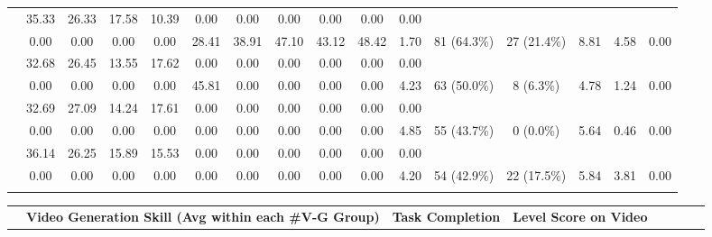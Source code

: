 \documentclass[letterpaper]{article} %
\begin{document}
\begin{table*}[t!]
\begin{tabular}{p{2cm} cccccccccc cc ccc}
\addlinespace[4pt]

\multirow{2}{*}{ Sa2VA-26B} & 35.33 & 26.33 & 17.58 & 10.39 & 0.00 & 0.00 & 0.00 & 0.00 & 0.00 &0.00 &  &  &  &  &  \\
& 0.00 & 0.00 & 0.00 & 0.00 & 28.41 & 38.91 & 47.10 & 43.12 & 48.42 & 1.70 & \multirow{-2}{*}{81 (64.3\%)} & \multirow{-2}{*}{27 (21.4\%)} & \multirow{-2}{*}{8.81} & \multirow{-2}{*}{4.58} & \multirow{-2}{*}{0.00} \\

\addlinespace[4pt]

\rowcolor{bg-tb-light-video} & 32.68 & 26.45 & 13.55 & 17.62 & 0.00 & 0.00 & 0.00 & 0.00 & 0.00 &0.00 &  &  &  &  &  \\
\rowcolor{bg-tb-light-video} \multirow{-2}{*}{ CoLVA-4B}  & 0.00 & 0.00 & 0.00 & 0.00 & 45.81 & 0.00 & 0.00 & 0.00 & 0.00 & 4.23 & \multirow{-2}{*}{63 (50.0\%)} & \multirow{-2}{*}{8 (6.3\%)} & \multirow{-2}{*}{4.78} & \multirow{-2}{*}{1.24} & \multirow{-2}{*}{0.00} \\

\addlinespace[4pt]

\multirow{2}{*}{ InternVL-2-8B} & 32.69 & 27.09 & 14.24 & 17.61 & 0.00 & 0.00 & 0.00 & 0.00 & 0.00 & 0.00 & &  &  &  &  \\
& 0.00 & 0.00 & 0.00 & 0.00 & 0.00 & 0.00 & 0.00 & 0.00 & 0.00 & 4.85 & \multirow{-2}{*}{55 (43.7\%)} & \multirow{-2}{*}{0 (0.0\%)} & \multirow{-2}{*}{5.64} & \multirow{-2}{*}{0.46} & \multirow{-2}{*}{0.00} \\

\addlinespace[4pt]

\rowcolor{bg-tb-light-video} & 36.14 & 26.25 & 15.89 & 15.53 & 0.00 & 0.00 & 0.00 & 0.00 & 0.00 &0.00 &  &  &  &  &  \\
\rowcolor{bg-tb-light-video} \multirow{-2}{*}{ Long-LLaVA-9B} & 0.00 & 0.00 & 0.00 & 0.00 & 0.00 & 0.00 & 0.00 & 0.00 & 0.00 & 4.20 & \multirow{-2}{*}{54 (42.9\%)} & \multirow{-2}{*}{22 (17.5\%)} & \multirow{-2}{*}{5.84} & \multirow{-2}{*}{3.81} & \multirow{-2}{*}{0.00} \\



\Xhline{1.5pt}
\end{tabular}%
{
\fontsize{7.5}{8}\selectfont 
\setlength{\tabcolsep}{2.2mm}
\begin{tabular}{p{2cm} cccccccccc cc ccc}


\addlinespace[4pt]
\rowcolor{bg-tb-heavey-video} & \multicolumn{6}{c}{\bf \textcolor{blueGen}{Video Generation Skill (Avg within each \#V-G Group)}} & \multicolumn{2}{c}{\bf Task Completion} & \multicolumn{3}{c}{\bf Level Score on Video} \\ 


\end{tabular}}
\end{table*}
\end{document}
